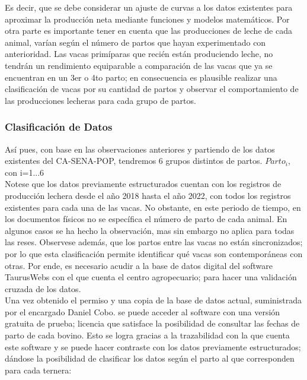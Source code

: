 Es decir, que se debe considerar un ajuste de curvas a los datos existentes para aproximar la producción neta mediante funciones y modelos matemáticos. Por otra parte es importante tener en cuenta que las producciones de leche de cada animal, varían según el número de partos que hayan experimentado con anterioridad. Las vacas primíparas que recién están produciendo leche, no tendrán un rendimiento equiparable a comparación de las vacas que ya se encuentran en un 3er o 4to parto; en consecuencia es plausible realizar una clasificación de vacas por su cantidad de partos y observar el comportamiento de las producciones lecheras para cada grupo de partos.\\

\subsubsection{Clasificación de Datos}

Así pues, con base en las observaciones anteriores y partiendo de los datos existentes del CA-SENA-POP, tendremos 6 grupos distintos de partos. $Parto_{i}$, con i=1...6\\

Notese que los datos previamente estructurados cuentan con los registros de producción lechera desde el año 2018 hasta el año 2022, con todos los registros existentes para cada una de las vacas. No obstante, en este periodo de tiempo, en los documentos físicos no se específica el número de parto de cada animal. En algunos casos se ha hecho la observación, mas sin embargo no aplica para todas las reses. Observese además, que los partos entre las vacas no están sincronizados; por lo que esta clasificación permite identificar qué vacas son contemporáneas con otras. Por ende, es necesario acudir a la base de datos digital del software TaurusWebs con el que cuenta el centro agropecuario; para hacer una validación cruzada de los datos.\\

Una vez obtenido el permiso y una copia de la base de datos actual, suministrada por el encargado Daniel Cobo. se puede acceder al software con una versión gratuita de prueba; licencia que satisface la posibilidad de consultar las fechas de parto de cada bovino. Esto se logra gracias a la trazabilidad con la que cuenta este software y se puede hacer contraste con los datos previamente estructurados; dándose la posibilidad de clasificar los datos según el parto al que corresponden para cada ternera:

